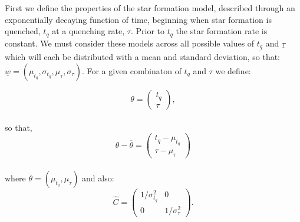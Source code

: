 \documentclass[a4paper, twoside, 12pt]{article}
\begin{document}
\title{}
\author{Becky Smethurst}
\date{\today}

\maketitle

First we define the properties of the star formation model, described through an exponentially decaying function of time, beginning when star formation is quenched, $t_{q}$ at a quenching rate, $\tau$. Prior to $t_{q}$ the star formation rate is constant. We must consider these models across all possible values of $\underline{t_{q}}$ and $\underline{\tau}$ which will each be distributed with a mean and standard deviation, so that: $\underline{w} = (\mu_{t_{q}}, \sigma_{t_{q}}, \mu_{\tau}, \sigma_{\tau})$. For a given combinaton of $t_{q}$ and $\tau$ we define:

\begin{equation*}
\theta = \left( \begin{array}{c}
t_{q}\\
\tau \end{array} \right),
\end{equation*}
\\
so that, 
\begin{equation*}
\theta - \overline{\theta} = \left( \begin{array}{c}
t_{q} - \mu_{t_{q}} \\
\tau - \mu_{\tau} \end{array} \right) 
\end{equation*}
\\
where $\overline{\theta} = (\mu_{t_{q}}, \mu_{\tau})$ and also:
\begin{equation*}
\hat{C} = \left( \begin{array}{cc}
1/\sigma^2_{t_{q}} & 0 \\
0 & 1/\sigma^2_{\tau} \end{array} \right).
\end{equation*}
\end{document}
